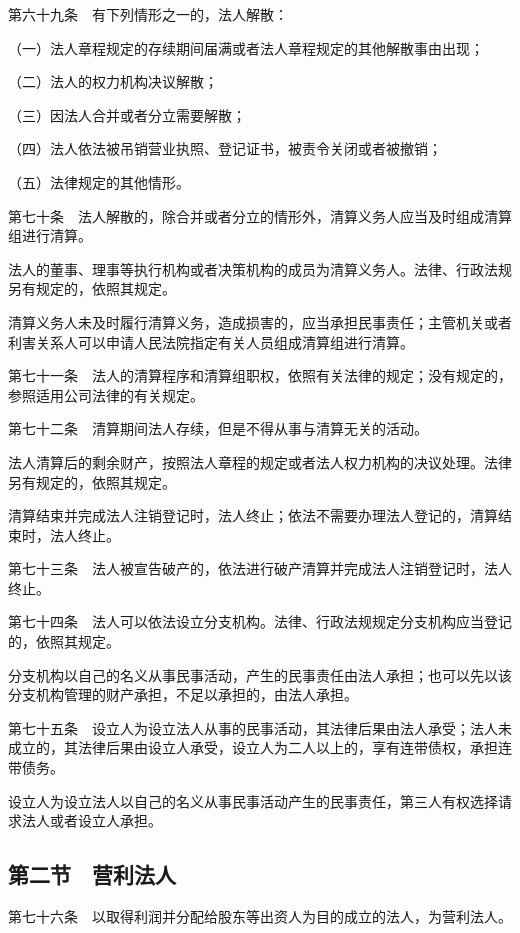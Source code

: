 \documentclass[UTF8,12pt,a4paper]{ctexbook}
\begin{document}
第六十九条　有下列情形之一的，法人解散：

（一）法人章程规定的存续期间届满或者法人章程规定的其他解散事由出现；

（二）法人的权力机构决议解散；

（三）因法人合并或者分立需要解散；

（四）法人依法被吊销营业执照、登记证书，被责令关闭或者被撤销；

（五）法律规定的其他情形。

第七十条　法人解散的，除合并或者分立的情形外，清算义务人应当及时组成清算组进行清算。

法人的董事、理事等执行机构或者决策机构的成员为清算义务人。法律、行政法规另有规定的，依照其规定。

清算义务人未及时履行清算义务，造成损害的，应当承担民事责任；主管机关或者利害关系人可以申请人民法院指定有关人员组成清算组进行清算。

第七十一条　法人的清算程序和清算组职权，依照有关法律的规定；没有规定的，参照适用公司法律的有关规定。

第七十二条　清算期间法人存续，但是不得从事与清算无关的活动。

法人清算后的剩余财产，按照法人章程的规定或者法人权力机构的决议处理。法律另有规定的，依照其规定。

清算结束并完成法人注销登记时，法人终止；依法不需要办理法人登记的，清算结束时，法人终止。

第七十三条　法人被宣告破产的，依法进行破产清算并完成法人注销登记时，法人终止。

第七十四条　法人可以依法设立分支机构。法律、行政法规规定分支机构应当登记的，依照其规定。

分支机构以自己的名义从事民事活动，产生的民事责任由法人承担；也可以先以该分支机构管理的财产承担，不足以承担的，由法人承担。

第七十五条　设立人为设立法人从事的民事活动，其法律后果由法人承受；法人未成立的，其法律后果由设立人承受，设立人为二人以上的，享有连带债权，承担连带债务。

设立人为设立法人以自己的名义从事民事活动产生的民事责任，第三人有权选择请求法人或者设立人承担。

\subsection*{第二节　营利法人}

第七十六条　以取得利润并分配给股东等出资人为目的成立的法人，为营利法人。
\end{document}
